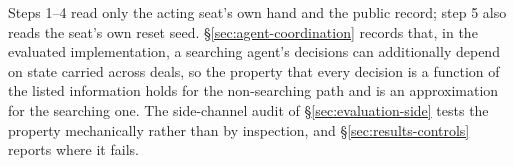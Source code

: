 Steps 1--4 read only the acting seat's own hand and the public record; step 5 also reads the seat's
own reset seed. \S\ref{sec:agent-coordination} records that, in the evaluated implementation, a
searching agent's decisions can additionally depend on state carried across deals, so the property
that every decision is a function of the listed information holds for the non-searching path and is
an approximation for the searching one. The side-channel audit of \S\ref{sec:evaluation-side} tests
the property mechanically rather than by inspection, and \S\ref{sec:results-controls} reports where
it fails.

